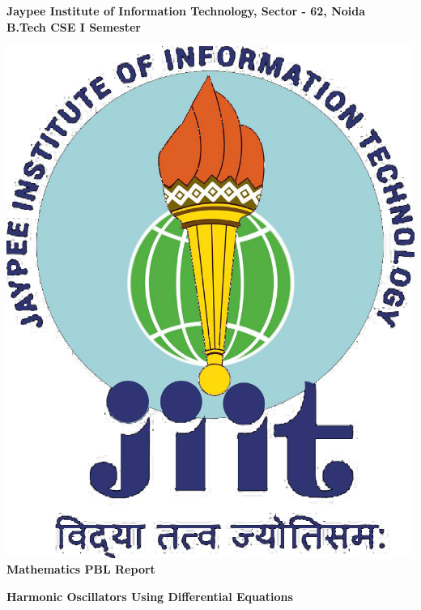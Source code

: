 \documentclass[12pt,a4paper]{article}
\begin{document}
\begin{titlepage}
    \centering
    
    \Huge
    \textbf{Jaypee Institute of Information Technology, Sector - 62, Noida } \\
    \vspace{0.5cm}
    \Large
    \textbf{B.Tech CSE I Semester}\\
    \vspace{1cm}
    \vspace*{\fill}
    
    \includegraphics[scale=0.2]{jiit_logo}\\
    
    \vspace{1.5cm}
    \Huge
    \textbf{Mathematics PBL Report}\\
    \Large
    
    \textbf{Harmonic Oscillators Using Differential Equations}\\
    \vspace{1cm}


\end{titlepage}
\end{document}
